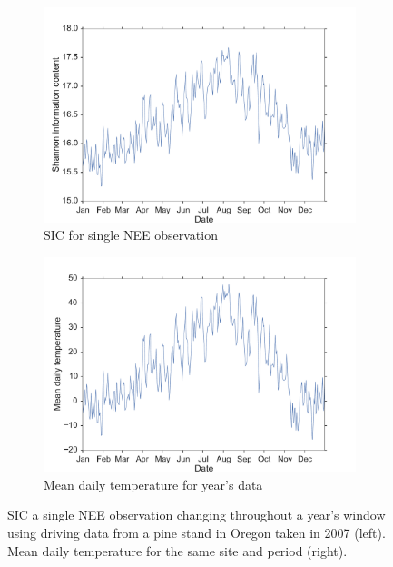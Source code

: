 \documentclass[11pt]{article}
\begin{document}
\begin{figure}[ht]
    \centering
    \begin{subfigure}[b]{0.45\textwidth}
        \includegraphics[width=\textwidth]{oregon2007SICneeD2.pdf}
        \caption{SIC for single NEE observation}
        \label{fig:sic_nee_oregon2007_D2}
    \end{subfigure}%
    \begin{subfigure}[b]{0.45\textwidth}
        \includegraphics[width=\textwidth]{oregon2007temp.pdf}
        \caption{Mean daily temperature for year's data}
        \label{fig:temp_nee_oregon2007_D2}
    \end{subfigure}
    \caption{SIC a single NEE observation changing throughout a year's window using driving data from a pine stand in Oregon taken in 2007 (left). Mean daily temperature for the same site and period (right).}
    \label{fig:neeSIC_temp_comp_D2}
\end{figure}
\end{document}
